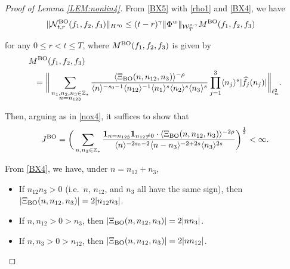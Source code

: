 \documentclass[letterpaper, 11pt,  reqno]{amsart}
\newcommand{\1}{\hspace{0.5mm}\text{I}\hspace{0.5mm}}
\newcommand{\noi}{\noindent}
\newcommand{\Z}{\mathbb{Z}}
\newcommand{\g}{\gamma}
\newcommand{\ft}{\widehat}
\renewcommand{\l}{\ell}
\newcommand{\jb}[1]
{\langle #1 \rangle}
\newcommand{\ind}{\mathbf 1}
\newcommand{\NN}{\mathcal{N}}
\newcommand{\W}{\mathcal{W}}
\newcommand{\BO}{\text{\rm BO} }
\numberwithin{equation}{section}
\numberwithin{theorem}{section}
\begin{document}
\begin{proof}[Proof of Lemma \ref{LEM:nonlin4}]





From \eqref{BX5} with \eqref{rho1} and \eqref{BX4}, we have
\begin{align*}
 \| \NN^\BO_{t, r}(f_1, f_2,  f_3)\|_{H^{s_0}}
&  \le
(t-r)^\g \|\Phi^w\|_{  \W^{\rho,\g}_T}M^\BO(f_1, f_2, f_3)
\end{align*}

\noi
for any $0 \le r < t \le T$, 
where $M^\BO(f_1, f_2, f_3)$ is given by 
\begin{align*}
& M^\BO(f_1, f_2, f_3)\\
& \ \  =\bigg\|
\sum_{\substack{n_1, n_2, n_3 \in \Z_*\\n = n_{123}}}
\frac{\jb{\Xi_\BO(n, n_{12}, n_3)}^{-\rho}}{\jb{n}^{-s_0 - 1}
\jb{n_{12}}^{-1}
\jb{n_1}^{s}\jb{n_2}^{s}\jb{n_3}^{s}} 
\prod_{j = 1}^3\jb{n_j}^s|\ft f_j(n_j)|
\bigg\|_{\l^2_n}.
\end{align*}


\noi
Then, arguing as in \eqref{nox4}, 
it suffices to show that 
\begin{align*}
 J^\BO
= \bigg(\sum_{n,  n_3 \in \Z_*}
\frac{\ind_{n = n_{123}}
\ind_{n_{12} \ne0}
\cdot \jb{\Xi_\BO(n, n_{12}, n_3)}^{-2\rho}}
{\jb{n}^{-2s_0 - 2}
\jb{n - n_3}^{-2+2s}
\jb{n_3}^{2s}} 
\bigg)^\frac 12 < \infty.
\end{align*}







From \eqref{BX4}, we have, under $n = n_{12} + n_3$,  

\smallskip

\begin{itemize}
\item[(a)]
If $n_{12}n_3>0$ (i.e.~$n$, $n_{12}$, and $n_3$ all have the same sign), 
then  $|\Xi_\BO(n, n_{12}, n_3)|=2|n_{12}n_3|$.


\smallskip


\item[(b)]
If $n, n_{12}>0>n_3$,  then  $|\Xi_\BO(n, n_{12}, n_3)|=2|n n_3|$.



\smallskip


\item[(c)]


If $n, n_3>0>n_{12}$,  then  $|\Xi_\BO(n, n_{12}, n_3)|=2|n n_{12}|$.



\end{itemize}
\end{proof}
\end{document}
